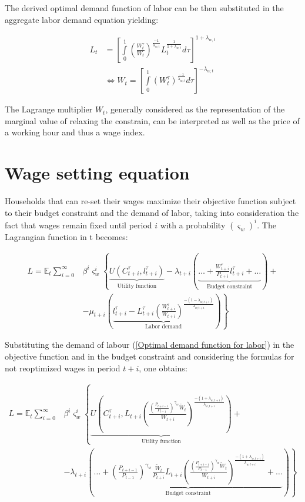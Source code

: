 \documentclass{pracamgr}
\numberwithin{equation}{section}
\begin{document}
The derived optimal demand function of labor can be then substituted in the aggregate labor demand equation yielding:

\begin{align}
L_{t} &= \left[ \int\limits_{0}^{1} \left( \frac{W_{t}^{\tau}}{W_{t}}\right)^{\frac{-1}{\lambda_{w ,t}}} L_{t}^{\frac{1}{1+\lambda_{w ,t}}} d\tau \right]^{1+\lambda_{w,t}} \nonumber \\
& \iff W_{t} = \left[ \int\limits_{0}^{1} \left( W_{t}^{\tau} \right)^{\frac{-1}{\lambda_{w ,t}}}  d\tau \right]^{-\lambda_{w,t}}
\end{align}

The Lagrange multiplier $W_{t}$, generally considered as the representation of the marginal value of relaxing the constrain, can be interpreted as well as the price of a working hour and thus a wage index.

\section*{Wage setting equation}

Households that can re-set their wages maximize their objective function subject to their budget constraint and the demand of labor, taking into consideration the fact that wages remain fixed until period $i$ with a probability $\left( \varsigma_{w} \right)^{i}$. The Lagrangian function in t becomes:

\begin{align}
L = \mathbb{E}_{t} \sum\limits_{i=0}^{\infty} &\beta^{i} \varsigma_{w}^{i} \left\{\underbrace{U \left(C_{t+i}^{\tau}, l_{t+i}^{\tau} \right)}_\text{Utility function} - \lambda_{t+i} \left( \underbrace{\ldots + \frac{W_{t+i}^{\tau}}{P_{t+i}} l_{t+i}^{\tau} + \ldots }_\text{Budget constraint} \right) + \nonumber \right. \\ 
& \left. - \mu_{t+i} \left( \underbrace{l_{t+i}^{\tau} - L_{t+i}^{\tau} \left(\frac{W_{t+i}^{\tau}}{W_{t+i}} \right)^{\frac{-\left(1-\lambda_{w, t+i}\right)}{\lambda_{w, t+i}}}}_\text{Labor demand} \right) \right\}
\end{align}

Substituting the demand of labour (\ref{Optimal demand function for labor}) in the objective function and in the budget constraint and considering the formulas for not reoptimized wages in period $t+i$, one obtains:

\begin{align}
L = \mathbb{E}_{t} \sum\limits_{i=0}^{\infty} &\beta^{i} \varsigma_{w}^{i}  \left\{ \underbrace{U \left(C_{t+i}^{\tau}, L_{t+i} \left( \frac{\left( \frac{P_{t+i-1}}{P_{t-1}} \right)^{\gamma_{w}} \widetilde{W}_{t}}{W_{t+i}}\right)^{\frac{-(1+\lambda_{w,t+i})}{\lambda_{w,t+i}}} \right)}_\text{Utility function} + \right. \nonumber \\
& \left. - \lambda_{t+i} \left( \underbrace{\ldots + \left( \frac{P_{t+i-1}}{P_{t-1}} \right)^{\gamma_{w}} \frac{\widetilde{W}_{t}}{P_{t+i}} L_{t+i} \left( \frac{\left( \frac{P_{t+i-1}}{P_{t-1}} \right)^{\gamma_{w}} \widetilde{W}_{t}}{W_{t+i}}\right)^{\frac{-(1+\lambda_{w,t+i})}{\lambda_{w,t+i}}}
 + \ldots }_\text{Budget constraint} \right) \right\}
\end{align}
\end{document}
